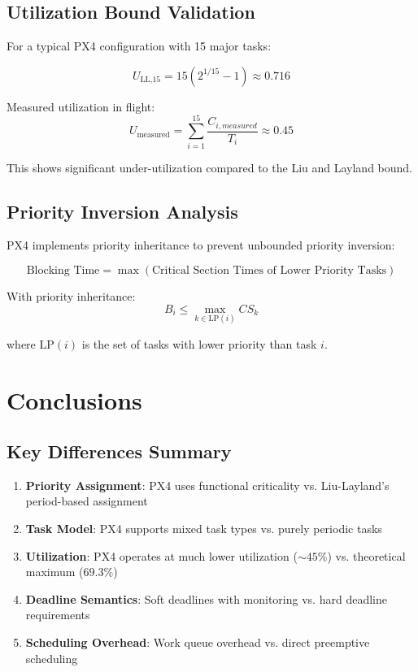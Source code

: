 \documentclass[12pt,a4paper]{article}
\begin{document}
\subsection{Utilization Bound Validation}

For a typical PX4 configuration with 15 major tasks:

\begin{equation}
U_{\text{LL,15}} = 15(2^{1/15} - 1) \approx 0.716
\end{equation}

Measured utilization in flight:
\begin{equation}
U_{\text{measured}} = \sum_{i=1}^{15} \frac{C_{i,measured}}{T_i} \approx 0.45
\end{equation}

This shows significant under-utilization compared to the Liu and Layland bound.

\subsection{Priority Inversion Analysis}

PX4 implements priority inheritance to prevent unbounded priority inversion:

\begin{equation}
\text{Blocking Time} = \max(\text{Critical Section Times of Lower Priority Tasks})
\end{equation}

With priority inheritance:
\begin{equation}
B_i \leq \max_{k \in \text{LP}(i)} CS_k
\end{equation}

where $\text{LP}(i)$ is the set of tasks with lower priority than task $i$.

\section{Conclusions}

\subsection{Key Differences Summary}

\begin{enumerate}
\item \textbf{Priority Assignment}: PX4 uses functional criticality vs. Liu-Layland's period-based assignment
\item \textbf{Task Model}: PX4 supports mixed task types vs. purely periodic tasks
\item \textbf{Utilization}: PX4 operates at much lower utilization ($\sim 45\%$) vs. theoretical maximum ($69.3\%$)
\item \textbf{Deadline Semantics}: Soft deadlines with monitoring vs. hard deadline requirements
\item \textbf{Scheduling Overhead}: Work queue overhead vs. direct preemptive scheduling
\end{enumerate}
\end{document}
